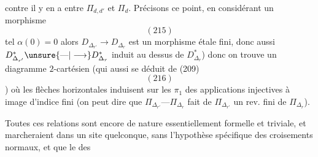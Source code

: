 contre il y en a entre $\Pi_{d,d'}$ et $\Pi_d$.
Précisons ce point, en considérant un
morphisme
\[
(215)
\]
tel  $\alpha(0)=0$
alors $D_{\Delta_{r'}}\longrightarrow D_{\Delta_r}$ est un morphisme
étale fini, donc aussi $D^*_{\Delta_{r'}}\unsure{\text{---}|\longrightarrow}D^*_{\Delta_r}$ induit
au dessus de $D^*_{\Delta_r}$) donc on trouve
un diagramme $2$-cartésien (qui 
 aussi se déduit de (209)
\[
(216)
\]
)
où les flèches horizontales induisent sur
les $\pi_1$ des applications injectives à
image d'indice fini (on peut dire que
$\Pi_{\Delta_{r'}}\text{---}\Pi_{\Delta_r}$ fait de $\Pi_{\Delta_{r'}}$ un
rev. fini de $\Pi_{\Delta_r}$).

Toutes ces relations sont encore de
nature essentiellement formelle et triviale,
et marcheraient dans un site quelconque,
sans l'hypothèse spécifique des croisements
normaux, et  que le  des

